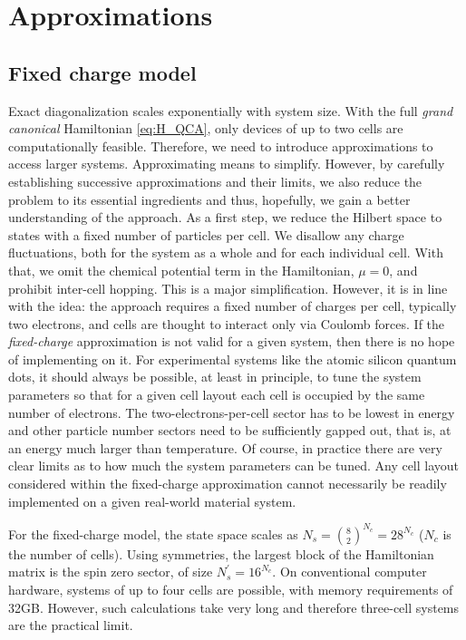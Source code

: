 \chapter{\label{ch:approximations}Approximations}
\graphicspath{{../gfx/chapter02/}{../plots/chapter02/}}

\section{Fixed charge model}

Exact diagonalization scales exponentially with system size. With the full
\emph{grand canonical}  Hamiltonian \eqref{eq:H_QCA}, only devices of
up to two cells are computationally feasible. Therefore, we need to introduce
approximations to access larger systems. Approximating means to simplify.
However, by carefully establishing successive approximations and their limits,
we also reduce the problem to its essential ingredients and thus, hopefully, we
gain a better understanding of the  approach. As a first step, we
reduce the Hilbert space to states with a fixed number of particles per cell. We
disallow any charge fluctuations, both for the system as a whole and for each
individual cell. With that, we omit the chemical potential term in the
Hamiltonian, $\mu = 0$, and prohibit inter-cell hopping. This is a major
simplification. However, it is in line with the  idea: the approach
requires a fixed number of charges per cell, typically two electrons, and cells
are thought to interact only via Coulomb forces. If the \emph{fixed-charge}
approximation is not valid for a given system, then there is no hope of
implementing  on it. For experimental systems like the atomic silicon
quantum dots, it should always be possible, at least in principle, to tune the
system parameters so that for a given cell layout each cell is occupied by the
same number of electrons. The two-electrons-per-cell sector has to be lowest in
energy and other particle number sectors need to be sufficiently gapped out,
that is, at an energy much larger than temperature. Of course, in practice there
are very clear limits as to how much the system parameters can be tuned. Any
 cell layout considered within the fixed-charge approximation cannot
necessarily be readily implemented on a given real-world material system.

For the fixed-charge model, the state space scales as $N_s = \binom{8}{2}^{N_c}
= 28^{N_c}$ ($N_c$ is the number of cells). Using symmetries, the largest block
of the Hamiltonian matrix is the spin zero sector, of size $N_s^{\prime} =
16^{N_c}$. On conventional computer hardware, systems of up to four cells are
possible, with memory requirements of 32GB. However, such calculations take very
long and therefore three-cell systems are the practical limit.


